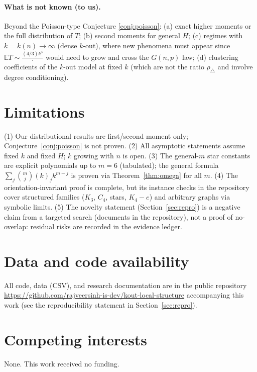 \documentclass[11pt,a4paper]{article}
\theoremstyle{definition}
\theoremstyle{definition}
\begin{document}
\paragraph{What is not known (to us).} Beyond the Poisson-type Conjecture
\ref{conj:poisson}: (a) exact higher moments or the full distribution of $T$;
(b) second moments for general $H$; (c) regimes with $k=k(n)\to\infty$ (dense
$k$-out), where new phenomena must appear since
$\mathbb E T\sim \tfrac{(4/3)k^3}{\cdot}$ would need to grow and cross the
$G(n,p)$ law; (d) clustering coefficients of the $k$-out model at fixed $k$ (which
are not the ratio $\rho_\triangle$ and involve degree conditioning).

\section{Limitations}\label{sec:limits}

(1) Our distributional results are first/second moment only;
Conjecture~\ref{conj:poisson} is not proven. (2) All asymptotic statements assume
fixed $k$ and fixed $H$; $k$ growing with $n$ is open. (3) The general-$m$ star
constants are explicit polynomials up to $m=6$ (tabulated); the general
formula $\sum_j\binom{m}{j}(k)_j k^{m-j}$ is proven via
Theorem~\ref{thm:omega} for all $m$. (4) The orientation-invariant proof is
complete, but its instance checks in the repository cover structured families
($K_3$, $C_4$, stars, $K_4-e$) and arbitrary graphs via symbolic limits. (5) The novelty statement
(Section~\ref{sec:repro}) is a negative claim from a targeted search (documents in
the repository), not a proof of no-overlap: residual risks are recorded in the
evidence ledger.

\section*{Data and code availability}
All code, data (CSV), and research documentation are in the public repository
\url{https://github.com/rajveersinh-is-dev/kout-local-structure}
accompanying this work (see the reproducibility statement in
Section~\ref{sec:repro}).

\section*{Competing interests}
None. This work received no funding.

\appendix
\end{document}
